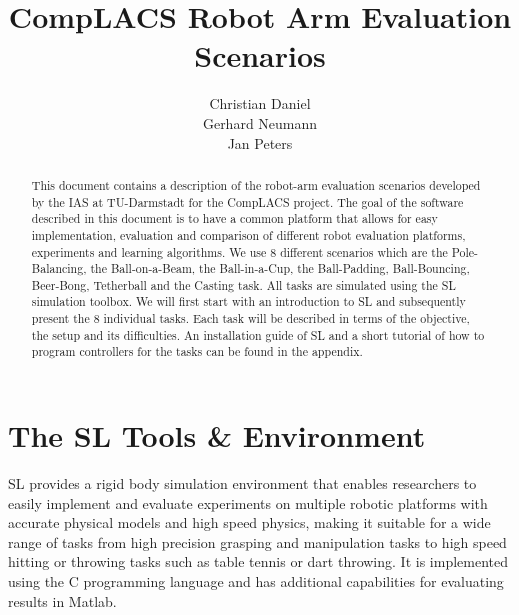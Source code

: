 \documentclass[11pt, article, colorback]{article}
\title{{CompLACS Robot Arm Evaluation Scenarios}}
\author{Christian Daniel \\ Gerhard Neumann \\ Jan Peters \newline }
\begin{document}
\maketitle

\begin{abstract}This document contains a description of the robot-arm evaluation scenarios developed by the IAS at TU-Darmstadt for the CompLACS project. 
The goal of the software described in this document is to have a common platform that allows for easy implementation, evaluation and 
comparison of different robot evaluation platforms, experiments and learning algorithms. 
We use 8 different scenarios which are the Pole-Balancing, the Ball-on-a-Beam, the Ball-in-a-Cup, the  Ball-Padding,
Ball-Bouncing, Beer-Bong, Tetherball and the Casting task. All tasks are simulated using the SL simulation toolbox. We will first start with an introduction to SL and subsequently present the 8 individual tasks. Each task will be described in terms of the objective, the setup and its difficulties.  An installation guide of SL and a short tutorial of 
how to program controllers for the tasks can be found in the appendix.
\end{abstract}

\newpage \tableofcontents \newpage

\section{The SL Tools \& Environment}

SL \cite{Schaal:2006tq} provides a rigid body simulation environment that enables researchers to easily implement and evaluate experiments on multiple robotic 
platforms with accurate physical models and high speed physics, making it suitable for a wide range of tasks from high 
precision grasping and manipulation tasks to high speed hitting or throwing tasks such as table tennis or dart throwing.  
It is implemented using the C programming language and has additional capabilities 
for evaluating results in Matlab. 
\end{document}
